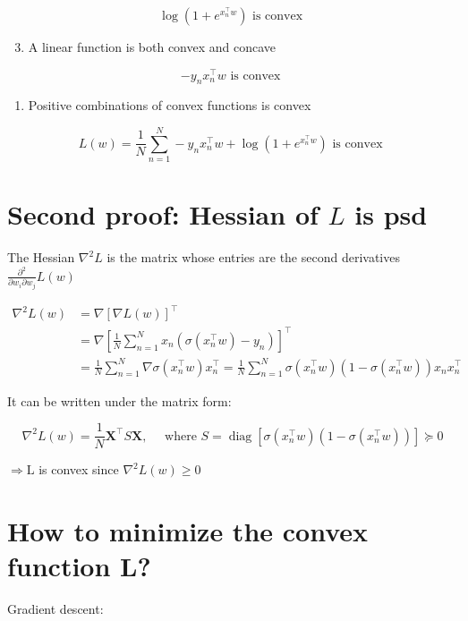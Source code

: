\documentclass[10pt]{article}
\begin{document}
$$
\log \left(1+e^{x_{n}^{\top} w}\right) \text { is convex }
$$

\begin{enumerate}
  \setcounter{enumi}{2}
  \item A linear function is both convex and concave
\end{enumerate}

$$
-y_{n} x_{n}^{\top} w \text { is convex }
$$

\begin{enumerate}
  \item Positive combinations of convex functions is convex
\end{enumerate}

$$
L(w)=\frac{1}{N} \sum_{n=1}^{N}-y_{n} x_{n}^{\top} w+\log \left(1+e^{x_{n}^{\top} w}\right) \text { is convex }
$$

\section*{Second proof: Hessian of $L$ is psd}
The Hessian $\nabla^{2} L$ is the matrix whose entries are the second derivatives $\frac{\partial^{2}}{\partial w_{i} \partial w_{j}} L(w)$

$$
\begin{aligned}
\nabla^{2} L(w) & =\nabla[\nabla L(w)]^{\top} \\
& =\nabla\left[\frac{1}{N} \sum_{n=1}^{N} x_{n}\left(\sigma\left(x_{n}^{\top} w\right)-y_{n}\right)\right]^{\top} \\
& =\frac{1}{N} \sum_{n=1}^{N} \nabla \sigma\left(x_{n}^{\top} w\right) x_{n}^{\top}=\frac{1}{N} \sum_{n=1}^{N} \sigma\left(x_{n}^{\top} w\right)\left(1-\sigma\left(x_{n}^{\top} w\right)\right) x_{n} x_{n}^{\top}
\end{aligned}
$$

It can be written under the matrix form:

$$
\nabla^{2} L(w)=\frac{1}{N} \mathbf{X}^{\top} S \mathbf{X}, \quad \text { where } S=\operatorname{diag}\left[\sigma\left(x_{n}^{\top} w\right)\left(1-\sigma\left(x_{n}^{\top} w\right)\right)\right] \succcurlyeq 0
$$

$\Rightarrow \mathrm{L}$ is convex since $\nabla^{2} L(w) \geqslant 0$

\section*{How to minimize the convex function L?}
Gradient descent:
\end{document}
